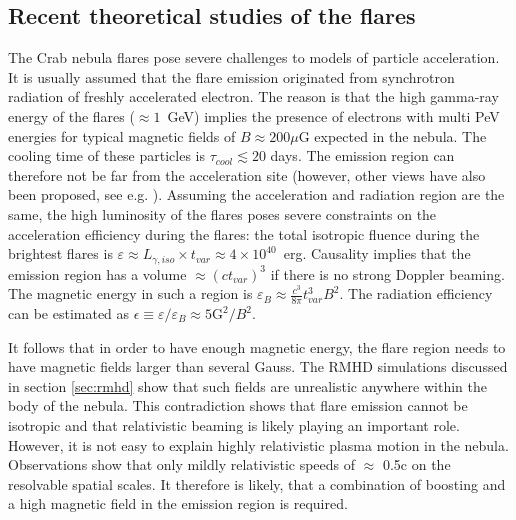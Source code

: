 \subsection{Recent theoretical studies of the flares}

The Crab nebula flares pose severe challenges to models of particle acceleration. It is usually assumed that the flare emission originated from synchrotron radiation of freshly accelerated electron. The reason is that the high gamma-ray energy of the flares ($\approx 1$~GeV) implies the presence of electrons with multi PeV energies for typical magnetic fields of $B \approx 200 \mu$G expected in the nebula. The cooling time of these particles is $\tau_{cool} \lesssim 20$ days. The emission region can therefore not be far from the acceleration site  (however, other views have also been proposed, see e.g. \citet{Bykov_2012,2015arXiv151205426Z}). Assuming the acceleration and radiation region are the same, the high luminosity of the flares poses severe constraints on the acceleration efficiency during the flares: the total isotropic fluence during the brightest flares is $\varepsilon \approx L_{\gamma,iso} \times t_{var} \approx 4 \times 10^{40} $~erg. Causality implies that the emission region has a volume $\approx (c t_{var})^3$ if there is no strong Doppler beaming. The magnetic energy in such a region is $\varepsilon_B \approx \frac{c^3}{8 \pi} t_{var}^3 B^2$. The radiation efficiency can be estimated as $\epsilon \equiv \varepsilon / \varepsilon_B \approx  5 \textrm{G}^2 / B^2$. 

It follows that in order to have enough magnetic energy, the flare region needs to have magnetic fields larger than several Gauss. The RMHD simulations discussed in section \ref{sec:rmhd} show that such fields are unrealistic anywhere within the body of the nebula.  This contradiction shows that flare emission cannot be isotropic and that relativistic beaming is likely playing an important role. However, it is not easy to explain highly relativistic plasma motion in the nebula. Observations show that only mildly relativistic speeds of $\approx$ 0.5c on the resolvable spatial scales. It therefore is likely, that a combination of boosting and a high magnetic field in the emission region is required.

